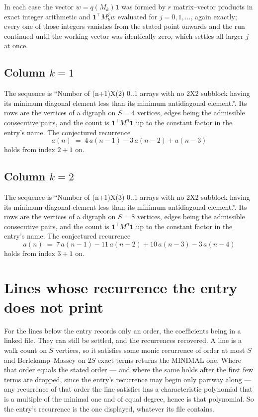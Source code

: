 \documentclass[11pt,a4paper]{article}
\theoremstyle{plain}
\theoremstyle{definition}
\begin{document}
In each case the vector $w=q(M_k)\mathbf{1}$ was formed by $r$ matrix--vector products in
exact integer arithmetic and $\mathbf{1}^{\!\top}M_k^{j}w$ evaluated for $j=0,1,\dots$,
again exactly; every one of those integers vanishes from the stated point onwards and the run
continued until the working vector was identically zero, which settles all larger $j$ at once.

\subsection*{Column $k$$=1$}
The sequence is ``Number of (n+1)X(2) 0..1 arrays with no 2X2 subblock having its minimum diagonal element less than its minimum antidiagonal element.''. Its rows are the vertices of a digraph on
$S=4$ vertices, edges being the admissible consecutive pairs, and the count is
$\mathbf{1}^{\!\top}M^{n}\mathbf{1}$ up to the constant factor in the entry's name.
The conjectured recurrence
\[
a(n)\;=\;4\,a(n-1) - 3\,a(n-2) + a(n-3)
\]
holds from index $2+1$ on.

\subsection*{Column $k$$=2$}
The sequence is ``Number of (n+1)X(3) 0..1 arrays with no 2X2 subblock having its minimum diagonal element less than its minimum antidiagonal element.''. Its rows are the vertices of a digraph on
$S=8$ vertices, edges being the admissible consecutive pairs, and the count is
$\mathbf{1}^{\!\top}M^{n}\mathbf{1}$ up to the constant factor in the entry's name.
The conjectured recurrence
\[
a(n)\;=\;7\,a(n-1) - 11\,a(n-2) + 10\,a(n-3) - 3\,a(n-4)
\]
holds from index $3+1$ on.


\section{Lines whose recurrence the entry does not print}

For the lines below the entry records only an order, the coefficients being in a linked file.
They can still be settled, and the recurrences recovered. A line is a walk count on $S$
vertices, so it satisfies some monic recurrence of order at most $S$ and Berlekamp--Massey on
$2S$ exact terms returns the MINIMAL one. Where that order equals the stated order --- and
where the same holds after the first few terms are dropped, since the entry's recurrence may
begin only partway along --- any recurrence of that order the line satisfies has a
characteristic polynomial that is a multiple of the minimal one and of equal degree, hence is
that polynomial. So the entry's recurrence is the one displayed, whatever its file contains.
\end{document}
